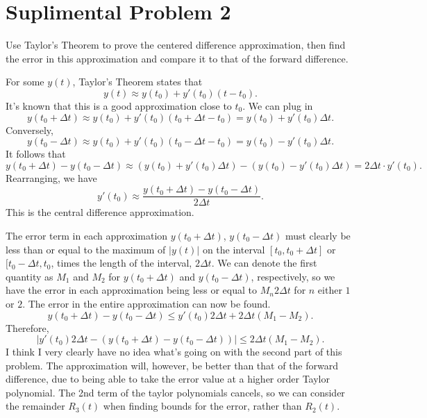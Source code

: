 \documentclass[11pt, letterpaper]{report}
\begin{document}
\section*{Suplimental Problem 2}
Use Taylor's Theorem to prove the centered difference approximation, then find the error in this approximation and compare it to that of the forward difference.
\begin{solution}
	For some $y(t)$, Taylor's Theorem states that
	\[
		y(t)\approx y(t_0)+y'(t_0)(t-t_0)
	.\]
	It's known that this is a good approximation close to $t_0$. We can plug in
	\[
		y(t_0+\Delta t)\approx y(t_0)+y'(t_0)(t_0+\Delta t-t_0)=y(t_0)+y'(t_0)\Delta t
	.\]
	Conversely,
	\[
		y(t_0-\Delta t)\approx y(t_0)+y'(t_0)(t_0-\Delta t-t_0)=y(t_0)-y'(t_0)\Delta t
	.\]
	It follows that
	\[
		y(t_0+\Delta t)-y(t_0-\Delta t)\approx \left( y(t_0)+y'(t_0)\Delta t \right) -\left( y(t_0)-y'(t_0)\Delta t \right) =2\Delta t\cdot y'(t_0)
	.\]
	Rearranging, we have
	\[
		y'(t_0)\approx \frac{y(t_0+\Delta t)-y(t_0-\Delta t)}{2\Delta t}
	.\]
	This is the central difference approximation.

	The error term in each approximation $y(t_0+\Delta t)$, $y(t_0-\Delta t)$ must clearly be less than or equal to the maximum of $|y(t)|$ on the interval $[t_0,t_0+\Delta t]$ or $[t_0-\Delta t,t_0$, times the length of the interval, $2\Delta t$. We can denote the first quantity as $M_1$ and $M_2$ for $y(t_0+\Delta t)$ and $y(t_0-\Delta t)$, respectively, so we have the error in each approximation being less or equal to $M_n2\Delta t$ for $n$ either $1$ or $2$. The error in the entire approximation can now be found.
	\[
		y(t_0+\Delta t)-y(t_0-\Delta t)\leq y'(t_0)2\Delta t+2\Delta t(M_1-M_2)
	.\]
	Therefore,
	\[
		\left| y'(t_0)2\Delta t-\left( y(t_0+\Delta t)-y(t_0-\Delta t) \right)  \right| \leq 2\Delta t(M_1 - M_2)
	.\]
	I think I very clearly have no idea what's going on with the second part of this problem. The approximation will, however, be better than that of the forward difference, due to being able to take the error value at a higher order Taylor polynomial. The 2nd term of the taylor polynomials cancels, so we can consider the remainder $R_3(t)$ when finding bounds for the error, rather than $R_2(t)$.
\end{solution}
\end{document}
